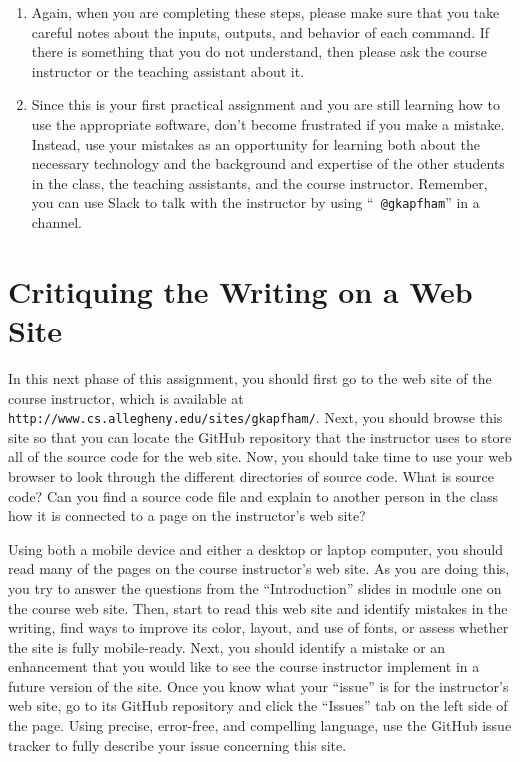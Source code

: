 \begin{enumerate}
  \item Again, when you are completing these steps, please make sure that you take careful notes about the inputs,
    outputs, and behavior of each command. If there is something that you do not understand, then please ask the course
    instructor or the teaching assistant about it.

  \item Since this is your first practical assignment and you are still learning how to use the appropriate software,
    don't become frustrated if you make a mistake. Instead, use your mistakes as an opportunity for learning both about
    the necessary technology and the background and expertise of the other students in the class, the teaching
    assistants, and the course instructor. Remember, you can use Slack to talk with the instructor by using ``{\tt
    @gkapfham}'' in a channel.

\end{enumerate}

\vspace*{-.15in}
\section*{Critiquing the Writing on a Web Site}

In this next phase of this assignment, you should first go to the web site of the course instructor, which is available
at {\tt http://www.cs.allegheny.edu/sites/gkapfham/}. Next, you should browse this site so that you can locate the
GitHub repository that the instructor uses to store all of the source code for the web site. Now, you should take time
to use your web browser to look through the different directories of source code. What is source code? Can you find a
source code file and explain to another person in the class how it is connected to a page on the instructor's web site?

Using both a mobile device and either a desktop or laptop computer, you should read many of the pages on the course
instructor's web site. As you are doing this, you try to answer the questions from the ``Introduction'' slides in module
one on the course web site. Then, start to read this web site and identify mistakes in the writing, find ways to improve
its color, layout, and use of fonts, or assess whether the site is fully mobile-ready. Next, you should identify a
mistake or an enhancement that you would like to see the course instructor implement in a future version of the site.
Once you know what your ``issue'' is for the instructor's web site, go to its GitHub repository and click the ``Issues''
tab on the left side of the page. Using precise, error-free, and compelling language, use the GitHub issue tracker to
fully describe your issue concerning this site.

